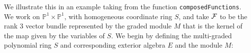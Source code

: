 \documentclass[twoside,12pt, leqno]{amsart}
\def\PP{{\mathbb P}}
\def\cornerT#1{{T_{\Rsh \kern -1pt #1}}}
\def\bT{{\bf T}}
\begin{document}
We illustrate this in an example taking from the function {\tt composedFunctions}. We work on 
$\PP^1\times \PP^1$, with homogeneous coordinate ring $S$, and take
${\mathcal F}$ to be the rank $3$ vector bundle represented by the graded module
$M$ that is the kernel of the map given by the variables of $S$.
We begin by defining the multi-graded polynomial ring $S$ and corresponding exterior algebra $E$ 
and the module $M$:
\end{document}
